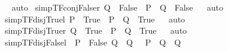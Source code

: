 \begin{isabellebody}
\isadelimproof
\ %
\endisadelimproof
%
\isatagproof
{}\isamarkupfalse%
\ auto%
\endisatagproof
{\isafoldproof}%
%
\isadelimproof
%
\endisadelimproof
\isanewline
{}\isamarkupfalse%
\ simp{\isacharunderscore}{\kern0pt}TF{\isacharunderscore}{\kern0pt}conj{\isacharunderscore}{\kern0pt}False{\isacharunderscore}{\kern0pt}r{\isacharcolon}{\kern0pt}\ {\isachardoublequoteopen}Q\ {\isacharequal}{\kern0pt}\ False\ {\isacharequal}{\kern0pt}{\isacharequal}{\kern0pt}{\isachargreater}{\kern0pt}\ {\isacharparenleft}{\kern0pt}P\ {\isasymand}\ Q{\isacharparenright}{\kern0pt}\ {\isacharequal}{\kern0pt}\ False{\isachardoublequoteclose}%
\isadelimproof
\ %
\endisadelimproof
%
\isatagproof
{}\isamarkupfalse%
\ auto%
\endisatagproof
{\isafoldproof}%
%
\isadelimproof
%
\endisadelimproof
\isanewline
{}\isamarkupfalse%
\ simp{\isacharunderscore}{\kern0pt}TF{\isacharunderscore}{\kern0pt}disj{\isacharunderscore}{\kern0pt}True{\isacharunderscore}{\kern0pt}l{\isacharcolon}{\kern0pt}\ {\isachardoublequoteopen}P\ {\isacharequal}{\kern0pt}\ True\ {\isacharequal}{\kern0pt}{\isacharequal}{\kern0pt}{\isachargreater}{\kern0pt}\ {\isacharparenleft}{\kern0pt}P\ {\isasymor}\ Q{\isacharparenright}{\kern0pt}\ {\isacharequal}{\kern0pt}\ True{\isachardoublequoteclose}%
\isadelimproof
\ %
\endisadelimproof
%
\isatagproof
{}\isamarkupfalse%
\ auto%
\endisatagproof
{\isafoldproof}%
%
\isadelimproof
%
\endisadelimproof
\isanewline
{}\isamarkupfalse%
\ simp{\isacharunderscore}{\kern0pt}TF{\isacharunderscore}{\kern0pt}disj{\isacharunderscore}{\kern0pt}True{\isacharunderscore}{\kern0pt}r{\isacharcolon}{\kern0pt}\ {\isachardoublequoteopen}Q\ {\isacharequal}{\kern0pt}\ True\ {\isacharequal}{\kern0pt}{\isacharequal}{\kern0pt}{\isachargreater}{\kern0pt}\ {\isacharparenleft}{\kern0pt}P\ {\isasymor}\ Q{\isacharparenright}{\kern0pt}\ {\isacharequal}{\kern0pt}\ True{\isachardoublequoteclose}%
\isadelimproof
\ %
\endisadelimproof
%
\isatagproof
{}\isamarkupfalse%
\ auto%
\endisatagproof
{\isafoldproof}%
%
\isadelimproof
%
\endisadelimproof
\isanewline
{}\isamarkupfalse%
\ simp{\isacharunderscore}{\kern0pt}TF{\isacharunderscore}{\kern0pt}disj{\isacharunderscore}{\kern0pt}False{\isacharunderscore}{\kern0pt}l{\isacharcolon}{\kern0pt}\ {\isachardoublequoteopen}{\isacharbrackleft}{\kern0pt}{\isacharbar}{\kern0pt}\ P\ {\isacharequal}{\kern0pt}\ False{\isacharsemicolon}{\kern0pt}\ Q\ {\isacharequal}{\kern0pt}\ Q{\isacharprime}{\kern0pt}\ {\isacharbar}{\kern0pt}{\isacharbrackright}{\kern0pt}\ {\isacharequal}{\kern0pt}{\isacharequal}{\kern0pt}{\isachargreater}{\kern0pt}\ {\isacharparenleft}{\kern0pt}P\ {\isasymor}\ Q{\isacharparenright}{\kern0pt}\ {\isacharequal}{\kern0pt}\ Q{\isacharprime}{\kern0pt}{\isachardoublequoteclose}%

\end{isabellebody}
